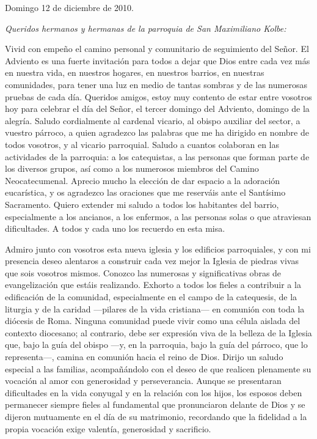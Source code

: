 Domingo 12 de diciembre de 2010.

\emph{Queridos hermanos y hermanas de la parroquia de San Maximiliano Kolbe:}

Vivid con empeño el camino personal y comunitario de seguimiento del Señor. El Adviento es una fuerte invitación para todos a dejar que Dios entre cada vez más en nuestra vida, en nuestros hogares, en nuestros barrios, en nuestras comunidades, para tener una luz en medio de tantas sombras y de las numerosas pruebas de cada día. Queridos amigos, estoy muy contento de estar entre vosotros hoy para celebrar el día del Señor, el tercer domingo del Adviento, domingo de la alegría. Saludo cordialmente al cardenal vicario, al obispo auxiliar del sector, a vuestro párroco, a quien agradezco las palabras que me ha dirigido en nombre de todos vosotros, y al vicario parroquial. Saludo a cuantos colaboran en las actividades de la parroquia: a los catequistas, a las personas que forman parte de los diversos grupos, así como a los numerosos miembros del Camino Neocatecumenal. Aprecio mucho la elección de dar espacio a la adoración eucarística, y os agradezco las oraciones que me reserváis ante el Santísimo Sacramento. Quiero extender mi saludo a todos los habitantes del barrio, especialmente a los ancianos, a los enfermos, a las personas solas o que atraviesan dificultades. A todos y cada uno los recuerdo en esta misa.

Admiro junto con vosotros esta nueva iglesia y los edificios parroquiales, y con mi presencia deseo alentaros a construir cada vez mejor la Iglesia de piedras vivas que sois vosotros mismos. Conozco las numerosas y significativas obras de evangelización que estáis realizando. Exhorto a todos los fieles a contribuir a la edificación de la comunidad, especialmente en el campo de la catequesis, de la liturgia y de la caridad ---pilares de la vida cristiana--- en comunión con toda la diócesis de Roma. Ninguna comunidad puede vivir como una célula aislada del contexto diocesano; al contrario, debe ser expresión viva de la belleza de la Iglesia que, bajo la guía del obispo ---y, en la parroquia, bajo la guía del párroco, que lo representa---, camina en comunión hacia el reino de Dios. Dirijo un saludo especial a las familias, acompañándolo con el deseo de que realicen plenamente su vocación al amor con generosidad y perseverancia. Aunque se presentaran dificultades en la vida conyugal y en la relación con los hijos, los esposos deben permanecer siempre fieles al fundamental  que pronunciaron delante de Dios y se dijeron mutuamente en el día de su matrimonio, recordando que la fidelidad a la propia vocación exige valentía, generosidad y sacrificio.

